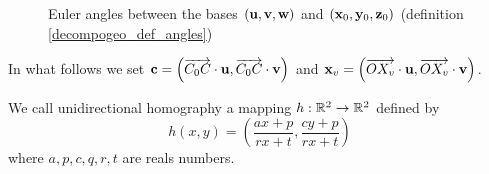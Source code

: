\begin{figure}
\centering
{}
\caption{Euler angles between the bases $(\mathbf{u},\mathbf{v},\mathbf{w})$ and $(\mathbf{x}_0,\mathbf{y}_0,\mathbf{z}_0)$ (definition \ref{decompogeo_def_angles})}%
\label{img_angles}
\label{decompgeo_rotationPropre}
\end{figure}

In what follows we set $\mathbf{c}= \left (\overrightarrow{C_0 C}\cdot \mathbf{u} , \overrightarrow{C_0 C}\cdot \mathbf{v} \right)$ and $\mathbf{x}_v=\left( \overrightarrow{O X_v}\cdot \mathbf{u} , \overrightarrow{O X_v}\cdot \mathbf{v} \right )$.\\

 \begin{Def}
We call unidirectional homography a mapping $h:\mathbb{R}^{2} \rightarrow \mathbb{R}^{2}$ defined by
\begin{equation*}
h(x,y)=\left ( \frac{ax+p}{rx+t} , \frac{cy+p}{rx+t} \right)
\end{equation*}
where $a,p,c,q,r,t$ are reals numbers.
\label{homo_uni_direc}
\end{Def}

